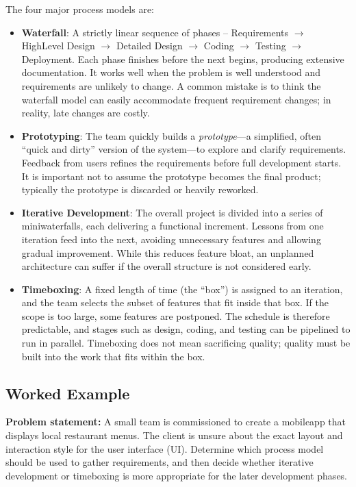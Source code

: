 \documentclass[12pt, a4paper]{article}
\begin{document}
The four major process models are:
\begin{itemize}
  \item \textbf{Waterfall}: A strictly linear sequence of phases -- Requirements $\rightarrow$ HighLevel Design $\rightarrow$ Detailed Design $\rightarrow$ Coding $\rightarrow$ Testing $\rightarrow$ Deployment.  Each phase finishes before the next begins, producing extensive documentation.  It works well when the problem is well understood and requirements are unlikely to change.  A common mistake is to think the waterfall model can easily accommodate frequent requirement changes; in reality, late changes are costly.
  \item \textbf{Prototyping}: The team quickly builds a \emph{prototype}---a simplified, often ``quick and dirty'' version of the system---to explore and clarify requirements.  Feedback from users refines the requirements before full development starts.  It is important not to assume the prototype becomes the final product; typically the prototype is discarded or heavily reworked.
  \item \textbf{Iterative Development}: The overall project is divided into a series of miniwaterfalls, each delivering a functional increment.  Lessons from one iteration feed into the next, avoiding unnecessary features and allowing gradual improvement.  While this reduces feature bloat, an unplanned architecture can suffer if the overall structure is not considered early.
  \item \textbf{Timeboxing}: A fixed length of time (the ``box'') is assigned to an iteration, and the team selects the subset of features that fit inside that box.  If the scope is too large, some features are postponed.  The schedule is therefore predictable, and stages such as design, coding, and testing can be pipelined to run in parallel.  Timeboxing does not mean sacrificing quality; quality must be built into the work that fits within the box.
\end{itemize}

\subsection{Worked Example}
\textbf{Problem statement:} A small team is commissioned to create a mobileapp that displays local restaurant menus.  The client is unsure about the exact layout and interaction style for the user interface (UI).  Determine which process model should be used to gather requirements, and then decide whether iterative development or timeboxing is more appropriate for the later development phases.
\end{document}
